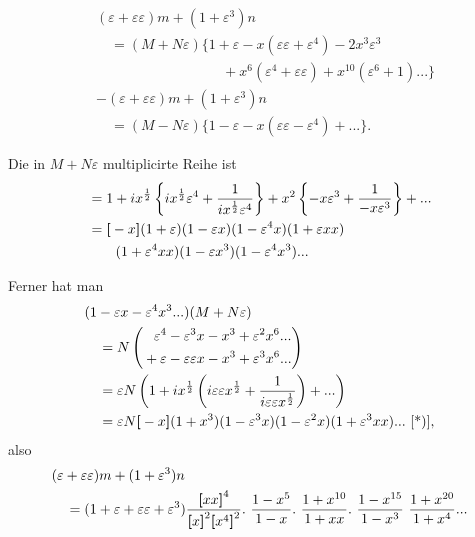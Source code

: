 \[\begin{aligned}
&(\varepsilon+\varepsilon\varepsilon)m+(1+\varepsilon^3)n\\
&\quad=(M+N\varepsilon)\{1+\varepsilon-x(\varepsilon\varepsilon+\varepsilon^4)-2x^3\varepsilon^3\\
&\hspace{9em}+x^6(\varepsilon^4+\varepsilon\varepsilon)+x^{10}(\varepsilon^6+1){.}{.}{.}\}\\[5pt]
&-(\varepsilon+\varepsilon\varepsilon)m+(1+\varepsilon^3)n\\
&\quad=(M-N\varepsilon)\{1-\varepsilon-x(\varepsilon\varepsilon-\varepsilon^4)+{.}{.}{.}\}.
\end{aligned}\]
\par\indent Die in $M+N\varepsilon$ multiplicirte Reihe ist
\[\begin{aligned}
&=1+ix^{\frac12}\left\{ix^{\frac12}\varepsilon^4+\frac1{ix^{\frac12}\varepsilon^4}\right\}+x^2\left\{-x\varepsilon^3+\frac1{-x\varepsilon^3}\right\}+{.}{.}{.}\\
&=\boldsymbol{[}-x\boldsymbol{]}(1+\varepsilon)(1-\varepsilon x)(1-\varepsilon^4x)(1+\varepsilon xx)\\
&\qquad(1+\varepsilon^4xx)(1-\varepsilon x^3)(1-\varepsilon^4x^3){.}{.}{.}
\end{aligned}\]
\par\indent Ferner hat man
\[\begin{aligned}
&(1-\varepsilon x-\varepsilon^4x^3{.}{.}{.})(M+N\varepsilon)\\
&\quad=N\left(\begin{aligned}&\phantom{+}\varepsilon^4-\varepsilon^3x-x^3+\varepsilon^2x^6{.}{.}{.}\\&+\varepsilon-\varepsilon\varepsilon x-x^3+\varepsilon^3x^6{.}{.}{.}\end{aligned}\right)\\
&\quad=\varepsilon N\left(1+ix^{\frac12}\left(i\varepsilon\varepsilon x^{\frac12}+\frac1{i\varepsilon\varepsilon x^{\frac12}}\right)+{.}{.}{.}\right)\\
&\quad=\varepsilon N\TransBracket{-x}(1+x^3)(1-\varepsilon^3x)(1-\varepsilon^2x)(1+\varepsilon^3xx){.}{.}{.}\ \text{[*)]},
\end{aligned}\]
\noindent also
\[\begin{aligned}
&(\varepsilon+\varepsilon\varepsilon)m+(1+\varepsilon^3)n\\
&\quad=(1+\varepsilon+\varepsilon\varepsilon+\varepsilon^3)\frac{\TransBracket{xx}^4}{\TransBracket{x}^2\TransBracket{x^4}^2}.\ \frac{1-x^5}{1-x}.\ \frac{1+x^{10}}{1+xx}.\ \frac{1-x^{15}}{1-x^3}\ \frac{1+x^{20}}{1+x^4}{.}{.}{.}
\end{aligned}\]
